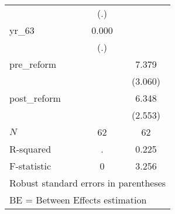 \begin{table}[htbp]
\begin{tabular}{l*{2}{c}}
            &         (.)         &                     \\
yr\_63       &       0.000         &                     \\
            &         (.)         &                     \\
pre\_reform  &                     &       7.379\sym{**} \\
            &                     &     (3.060)         \\
post\_reform &                     &       6.348\sym{**} \\
            &                     &     (2.553)         \\
\hline
\(N\)       &          62         &          62         \\
R-squared   &           .         &       0.225         \\
F-statistic &           0         &       3.256         \\
\hline\hline
\multicolumn{3}{l}{\footnotesize Robust standard errors in parentheses}\\
\multicolumn{3}{l}{\footnotesize BE = Between Effects estimation}\\
\end{tabular}
\end{table}
